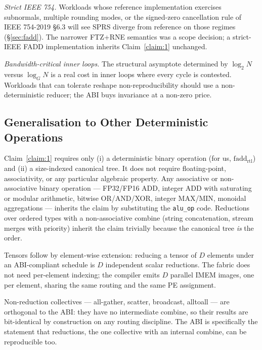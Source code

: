 \documentclass[journal,10pt]{IEEEtran}
\theoremstyle{plain}
\theoremstyle{definition}
\theoremstyle{remark}
\newcommand{\fadd}{\ensuremath{\mathrm{fadd}_{\mathrm{rtl}}}}
\newcommand{\sprs}{\textsc{SPRS}}
\newcommand{\sv}[1]{\texttt{#1}}
\begin{document}
\emph{Strict IEEE 754.} Workloads whose reference implementation
exercises subnormals, multiple rounding modes, or the signed-zero
cancellation rule of IEEE 754-2019 \S6.3 will see \sprs{} diverge from
reference on those regimes (\S\ref{sec:fadd}). The narrower FTZ+RNE
semantics was a scope decision; a strict-IEEE FADD implementation
inherits Claim~\ref{claim:1} unchanged.

\emph{Bandwidth-critical inner loops.} The structural asymptote determined
by $\log_2 N$ versus $\log_G N$ is a real cost in inner loops where
every cycle is contested. Workloads that can tolerate reshape
non-reproducibility should use a non-deterministic reducer; the ABI
buys invariance at a non-zero price.

\subsection{Generalisation to Other Deterministic Operations}

Claim~\ref{claim:1} requires only (i) a deterministic binary operation
(for us, $\fadd$) and (ii) a size-indexed canonical tree. It does not
require floating-point, associativity, or any particular algebraic
property. Any associative or non-associative binary operation ---
FP32/FP16 ADD, integer ADD with saturating or modular arithmetic,
bitwise OR/AND/XOR, integer MAX/MIN, monoidal aggregations --- inherits
the claim by substituting the \sv{alu\_op} code. Reductions over ordered
types with a non-associative combine (string concatenation, stream
merges with priority) inherit the claim trivially because the canonical
tree \emph{is} the order.

Tensors follow by element-wise extension: reducing a tensor of $D$
elements under an ABI-compliant schedule is $D$ independent scalar
reductions. The fabric does not need per-element indexing; the compiler
emits $D$ parallel IMEM images, one per element, sharing the same
routing and the same PE assignment.

Non-reduction collectives --- all-gather, scatter, broadcast, alltoall
--- are orthogonal to the ABI: they have no intermediate combine, so
their results are bit-identical by construction on any routing
discipline. The ABI is specifically the statement that reductions, the
one collective with an internal combine, can be reproducible too.

\end{document}
